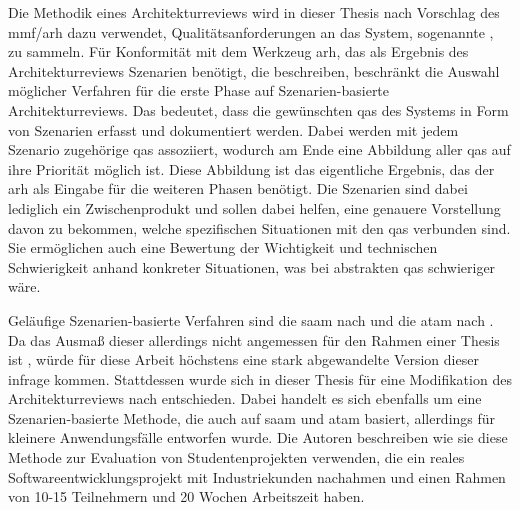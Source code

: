 Die Methodik eines Architekturreviews wird in dieser Thesis nach Vorschlag des \gls{mmf}/\gls{arh} dazu verwendet, Qualitätsanforderungen an das System, sogenannte , zu sammeln.
Für Konformität mit dem Werkzeug \gls{arh}, das als Ergebnis des Architekturreviews Szenarien benötigt, die  beschreiben, beschränkt die Auswahl möglicher Verfahren für die erste Phase auf Szenarien-basierte Architekturreviews.
Das bedeutet, dass die gewünschten \glspl{qa} des Systems in Form von Szenarien erfasst und dokumentiert werden.
Dabei werden mit jedem Szenario zugehörige \glspl{qa} assoziiert, wodurch am Ende eine Abbildung aller \glspl{qa} auf ihre Priorität möglich ist.
Diese Abbildung ist das eigentliche Ergebnis, das der \gls{arh} als Eingabe für die weiteren Phasen benötigt.
Die Szenarien sind dabei lediglich ein Zwischenprodukt und sollen dabei helfen, eine genauere Vorstellung davon zu bekommen, welche spezifischen Situationen mit den \glspl{qa} verbunden sind.
Sie ermöglichen auch eine Bewertung der Wichtigkeit und technischen Schwierigkeit anhand konkreter Situationen, was bei abstrakten \glspl{qa} schwieriger wäre.

Geläufige Szenarien-basierte Verfahren sind die \gls{saam} nach  und die \gls{atam} nach .
Da das Ausmaß dieser allerdings nicht angemessen für den Rahmen einer Thesis ist \cite{master-marvin-knodel}, würde für diese Arbeit höchstens eine stark abgewandelte Version dieser infrage kommen.
Stattdessen wurde sich in dieser Thesis für eine Modifikation des Architekturreviews nach  entschieden.
Dabei handelt es sich ebenfalls um eine Szenarien-basierte Methode, die auch auf \gls{saam} und \gls{atam} basiert, allerdings für kleinere Anwendungsfälle entworfen wurde.
Die Autoren beschreiben wie sie diese Methode zur Evaluation von Studentenprojekten verwenden, die ein reales Softwareentwicklungsprojekt mit Industriekunden nachahmen und einen Rahmen von 10-15 Teilnehmern und 20 Wochen Arbeitszeit haben.

